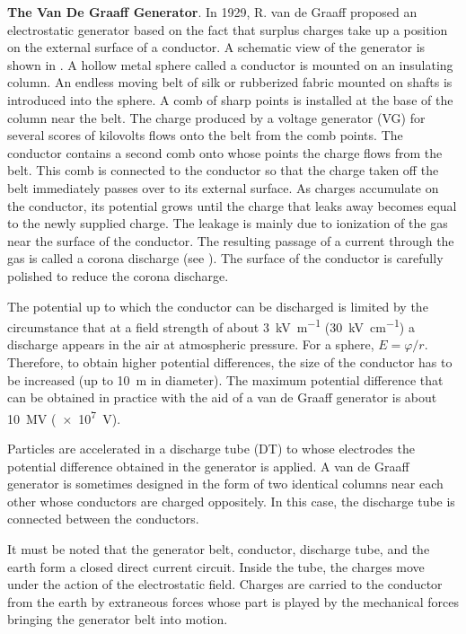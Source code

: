 \textbf{The Van De Graaff Generator}. In 1929, R. van de Graaff proposed an electrostatic generator based on the fact that surplus charges take up a position on the external surface of a conductor.
A schematic view of the generator is shown in .
A hollow metal sphere called a conductor is mounted
on an insulating column.
An endless moving belt of silk or rubberized fabric mounted on shafts is introduced into the sphere.
A comb of sharp points is installed at the base of the column near the belt.
The charge produced by a voltage generator (VG) for several scores of kilovolts flows onto the belt from
the comb points.
The conductor contains a second comb onto whose points the charge flows from the belt.
This comb is connected  to the conductor so that the charge taken off the belt immediately passes over to its external surface.
As charges accumulate on the conductor, its potential grows until the charge that leaks away becomes equal to the newly supplied charge.
The leakage is mainly due to ionization of the gas near the surface of the conductor.
The resulting passage of a current through the gas is called a corona discharge (see ).
The surface of the conductor is carefully polished to reduce the corona discharge.

The potential up to which the conductor can be discharged is limited by the circumstance that at a field strength of about \SI{3}{\kilo\volt\per\metre}
(\SI{30}{\kilo\volt\per\centi\metre}) a discharge appears in the air at atmospheric pressure.
For a sphere, $E=\varphi/r$.
Therefore, to obtain higher potential differences, the size of the conductor has to be increased (up to \SI{10}{\metre} in diameter).
The maximum potential difference that can be obtained in practice with the aid of a van de Graaff generator is about \SI{10}{\mega\volt} (\SI{e7}{\volt}).

Particles are accelerated in a discharge tube (DT) to whose electrodes the potential difference obtained in the generator is applied.
A van de Graaff generator is sometimes designed in the form of two identical columns near each other whose conductors are charged oppositely.
In this case, the discharge tube is connected between the conductors.

It must be noted that the generator belt, conductor, discharge tube, and the earth form a closed direct current circuit.
Inside the tube, the charges move under the action of the electrostatic field.
Charges are carried to the conductor from the earth by extraneous forces whose part is played by the mechanical forces bringing the generator belt into motion.


